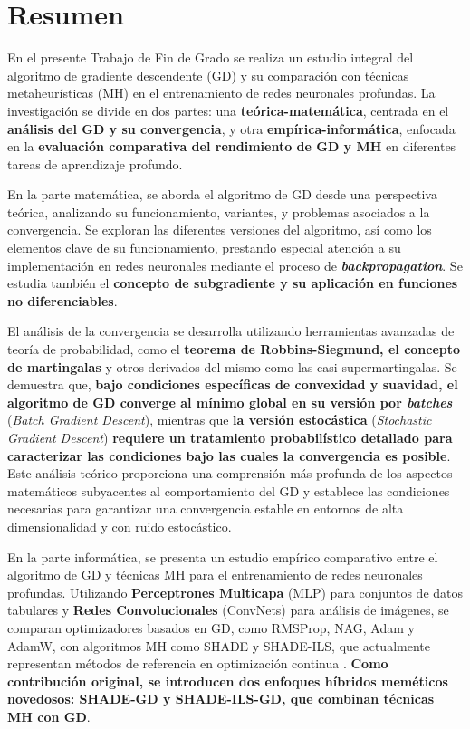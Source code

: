 
\pagestyle{sin_titulo_cab}

\section*{Resumen}

En el presente Trabajo de Fin de Grado se realiza un estudio integral del algoritmo de gradiente descendente (GD) y su comparación con técnicas metaheurísticas (MH) en el entrenamiento de redes neuronales profundas. La investigación se divide en dos partes: una \textbf{teórica-matemática}, centrada en el \textbf{análisis del GD y su convergencia}, y otra \textbf{empírica-informática}, enfocada en la \textbf{evaluación comparativa del rendimiento de GD y MH} en diferentes tareas de aprendizaje profundo.

En la parte matemática, se aborda el algoritmo de GD desde una perspectiva teórica,  analizando su funcionamiento, variantes, y problemas asociados a la convergencia. Se exploran las diferentes versiones del algoritmo, así como los elementos clave de su funcionamiento, prestando especial atención a su implementación en redes neuronales mediante el proceso de \textbf{\textit{backpropagation}}. Se estudia también el \textbf{concepto de subgradiente y su aplicación en funciones no diferenciables}. 

El análisis de la convergencia se desarrolla utilizando herramientas avanzadas de teoría de probabilidad, como el \textbf{teorema de Robbins-Siegmund, el concepto de martingalas} y otros derivados del mismo como las casi supermartingalas. Se demuestra que, \textbf{bajo condiciones específicas de convexidad y suavidad, el algoritmo de GD converge al mínimo global en su versión por \textit{batches}} (\textit{Batch Gradient Descent}), mientras que \textbf{la versión estocástica} (\textit{Stochastic Gradient Descent}) \textbf{requiere un tratamiento probabilístico detallado para caracterizar las condiciones bajo las cuales la convergencia es posible}. Este análisis teórico proporciona una comprensión más profunda de los aspectos matemáticos subyacentes al comportamiento del GD y establece las condiciones necesarias para garantizar una convergencia estable en entornos de alta dimensionalidad y con ruido estocástico.

En la parte informática, se presenta un estudio empírico comparativo entre el algoritmo de GD y técnicas MH para el entrenamiento de redes neuronales profundas. Utilizando \textbf{Perceptrones Multicapa} (MLP) para conjuntos de datos tabulares y \textbf{Redes Convolucionales} (ConvNets) para análisis de imágenes, se comparan optimizadores basados en GD, como RMSProp, NAG, Adam y AdamW, con algoritmos MH como SHADE y SHADE-ILS, que actualmente representan métodos de referencia en optimización continua \cite{MHtrainingClase}. \textbf{Como contribución original, se introducen dos enfoques híbridos meméticos novedosos: SHADE-GD y SHADE-ILS-GD, que combinan técnicas MH con GD}.

